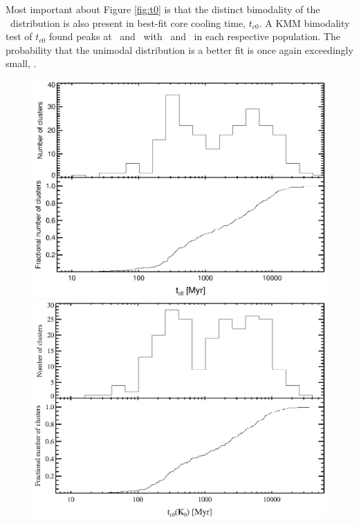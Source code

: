 Most important about Figure \ref{fig:t0} is that the distinct
bimodality of the \kna\ distribution is also present in best-fit core
cooling time, $t_{c0}$. A KMM bimodality test of $t_{c0}$ found peaks
at \tckmma\ and \tckmmb\ with \tckmmc\ and \tckmmd\ in each respective
population. The probability that the unimodal distribution is a better
fit is once again exceedingly small, \tckmme.

\begin{figure}[htp]
  \begin{center}
    \begin{minipage}[htp]{0.8\linewidth}
      \includegraphics*[width=\textwidth, trim=20mm 10mm 10mm 10mm, clip]{t0}
    \end{minipage}
    \begin{minipage}[htp]{0.8\linewidth}
      \includegraphics*[width=\textwidth, trim=20mm 10mm 10mm 10mm, clip]{k0cool}

\end{minipage}
\end{center}
\end{figure}
